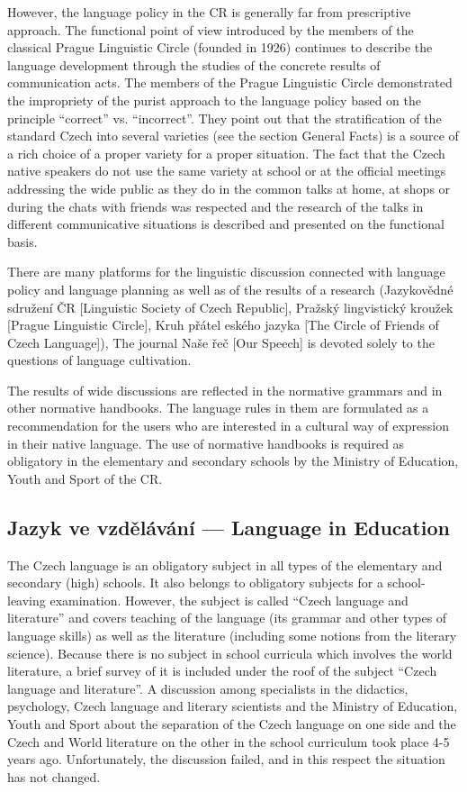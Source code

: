 \documentclass[]{../../metanetpaper}
\begin{document}
\begin{multicols}{2}
However, the language policy in the CR is generally far from prescriptive approach. The functional point of view introduced by the members of the classical Prague Linguistic Circle (founded in 1926) continues to describe the language development through the studies of the concrete results of communication acts. The members of the Prague Linguistic Circle demonstrated the impropriety of the purist approach to the language policy based on the principle “correct” vs. “incorrect”.  They point out that the stratification of the standard Czech into several varieties (see the section General Facts) is a source of a rich choice of a proper variety for a proper situation. The fact that the Czech native speakers do not use the same variety at school or at the official meetings addressing the wide public as they do in the common talks at home, at shops or during the chats with friends was respected and the research of the talks in different communicative  situations is described and presented on the functional basis.

There are many platforms for the linguistic discussion connected with language policy and language planning as well as of the results of a research (Jazykovědné sdružení ČR [Linguistic Society of Czech Republic], Pražský lingvistický kroužek {[}Prague Linguistic Circle{]}, Kruh přátel
eského jazyka {[}The Circle of Friends of Czech Language{]}), The journal Naše řeč [Our Speech] is devoted solely to the questions of language cultivation.

The results of wide discussions are reflected in the normative grammars and in other normative handbooks. The language rules in them are formulated as a recommendation for the users who are interested in a cultural way of expression in their native language. The use of normative handbooks is required as obligatory in the elementary and secondary schools by the Ministry of Education, Youth and Sport of the CR.

\subsection{Jazyk ve vzdělávání --- Language in Education}

The Czech language is an obligatory subject in all types of the elementary and secondary (high) schools. It also belongs to obligatory subjects for a school-leaving examination. However, the subject is called “Czech language and literature” and covers teaching of the language (its grammar and other types of language skills) as well as the literature (including some notions from the literary science).  Because there is no subject in school curricula which involves the world literature, a brief survey of it is included under the roof of the subject “Czech language and literature”. A discussion among specialists in the didactics, psychology, Czech language and literary scientists and the Ministry of Education, Youth and Sport about the separation of the Czech language on one side and the Czech and World literature on the other in the school curriculum took place 4-5 years ago. Unfortunately, the discussion failed, and in this respect the situation has not changed.


\end{multicols}
\end{document}
